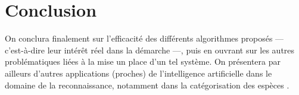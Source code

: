 \documentclass{article}
\begin{document}
\section{Conclusion}
  On conclura finalement sur l'efficacité des différents algorithmes proposés --- c'est-à-dire leur intérêt réel dans la démarche ---, puis en ouvrant sur les autres problématiques liées à la mise un place d'un tel système. On présentera par ailleurs d'autres applications (proches) de l'intelligence artificielle dans le domaine de la reconnaissance, notamment dans la catégorisation des espèces \cite{Branson:2014}.

   \nocite{3B1B:2018, Branson:2014, Rathi:2018, Rojas:1996, TF}


\end{document}
